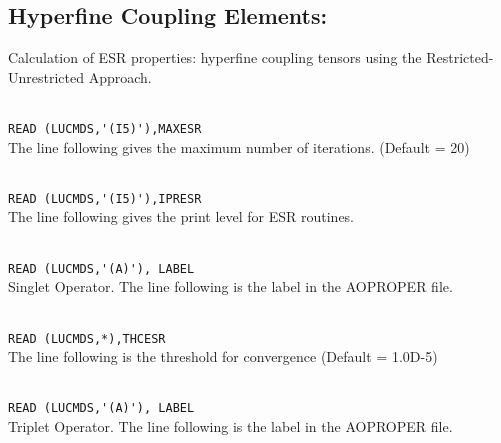 \subsection{Hyperfine Coupling Elements: }

Calculation of ESR properties: hyperfine coupling tensors using 
the Restricted-Unrestricted Approach.

\begin{description}

\item{}      \\
\verb|READ (LUCMDS,'(I5)'),MAXESR |\\
   The line following gives the maximum number of iterations.  (Default = 20)

\item{}     \\
\verb|READ (LUCMDS,'(I5)'),IPRESR |\\
   The line following gives the print level for ESR routines.

\item{}    \\
\verb|READ (LUCMDS,'(A)'), LABEL|\\
   Singlet Operator. The line following is the label in the AOPROPER file.

\item{}     \\
\verb|READ (LUCMDS,*),THCESR|\\
   The line following is the threshold for convergence (Default = 1.0D-5)

\item{}    \\
\verb|READ (LUCMDS,'(A)'), LABEL |\\
   Triplet Operator. The line following is the label in the AOPROPER file.


\end{description}




